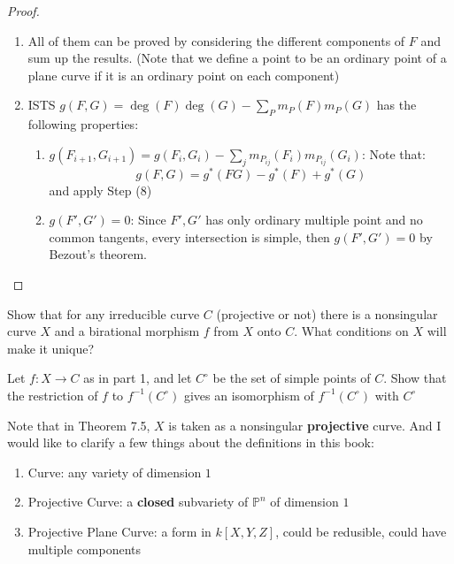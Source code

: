 \documentclass{solution}
\begin{document}
\begin{proof}
    \begin{enumerate}
        \item All of them can be proved by considering the different components of $F$ and sum up the results. (Note that we define a point to be an ordinary point of a plane curve if it is an ordinary point on each component)
        \item ISTS $g(F, G) = \deg(F) \deg(G) - \sum\limits_{P}m_P(F) m_P(G)$ has the following properties:
        \begin{enumerate}
            \item $g(F_{i + 1}, G_{i + 1}) = g(F_i, G_i) - \sum\limits_{j} m_{P_{ij}}(F_i) m_{P_{ij}}(G_i)$: Note that:
            $$g(F, G) = g^*(FG) - g^*(F) + g^*(G)$$
            and apply Step (8)
            \item $g(F', G') = 0$: Since $F', G'$ has only ordinary multiple point and no common tangents, every intersection is simple, then $g(F', G') = 0$ by Bezout's theorem.
        \end{enumerate}
    \end{enumerate}
\end{proof}

\begin{problem}{7.17}
    \begin{inparaenum}
        \item Show that for any irreducible curve $C$ (projective or not) there is a nonsingular curve $X$ and a birational morphism $f$ from $X$ onto $C$. What conditions on $X$ will make it unique?
        \item Let $f: X \rightarrow C$ as in part 1, and let $C^{\circ}$ be the set of simple points of $C$. Show that the restriction of $f$ to $f ^{-1}(C^{\circ})$ gives an isomorphism of $f ^{-1}(C^{\circ})$ with $C^{\circ}$
    \end{inparaenum}
\end{problem}

Note that in Theorem 7.5, $X$ is taken as a nonsingular \textbf{projective} curve. And I would like to clarify a few things about the definitions in this book:

\begin{enumerate}
    \item Curve: any variety of dimension $1$
    \item Projective Curve: a \textbf{closed} subvariety of $\mathbb{P}^n$ of dimension $1$
    \item Projective Plane Curve: a form in $k[X, Y, Z]$, could be redusible, could have multiple components
\end{enumerate}
\end{document}
